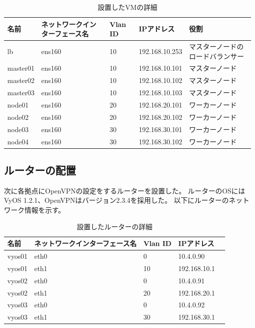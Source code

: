 \begin{landscape}
  \begin{table}[htb]
    \begin{center}
      \caption{設置したVMの詳細}
      \begin{tabular}{|l|l|l|l|l|} \hline
        名前 & ネットワークインターフェース名 & Vlan ID & IPアドレス & 役割 \\ \hline
        lb & ens160 & 10 & 192.168.10.253 & マスターノードのロードバランサー \\ \hline
        master01 & ens160 & 10 & 192.168.10.101 & マスターノード \\ \hline
        master02 & ens160 & 10 & 192.168.10.102 & マスターノード \\ \hline
        master03 & ens160 & 10 & 192.168.10.103 & マスターノード \\ \hline
        node01 & ens160 & 20 & 192.168.20.101 & ワーカーノード \\ \hline
        node02 & ens160 & 20 & 192.168.20.102 & ワーカーノード \\ \hline
        node03 & ens160 & 30 & 192.168.30.101 & ワーカーノード \\ \hline
        node04 & ens160 & 30 & 192.168.30.102 & ワーカーノード \\ \hline
      \end{tabular}
    \end{center}
  \end{table}
\end{landscape}

\subsection{ルーターの配置}

次に各拠点にOpenVPNの設定をするルーターを設置した。
ルーターのOSにはVyOS 1.2.1、OpenVPNはバージョン2.3.4を採用した。
以下にルーターのネットワーク情報を示す。

\begin{table}[htb]
  \begin{center}
    \caption{設置したルーターの詳細}
    \begin{tabular}{|l|l|l|l|l|} \hline
      名前 & ネットワークインターフェース名 & Vlan ID & IPアドレス \\ \hline
      vyos01 & eth0 & 0 & 10.4.0.90 \\ \hline
      vyos01 & eth1 & 10 & 192.168.10.1 \\ \hline
      vyos02 & eth0 & 0 & 10.4.0.91 \\ \hline
      vyos02 & eth1 & 20 & 192.168.20.1 \\ \hline
      vyos03 & eth0 & 0 & 10.4.0.92 \\ \hline
      vyos03 & eth1 & 30 & 192.168.30.1 \\ \hline
    \end{tabular}
  \end{center}
\end{table}

